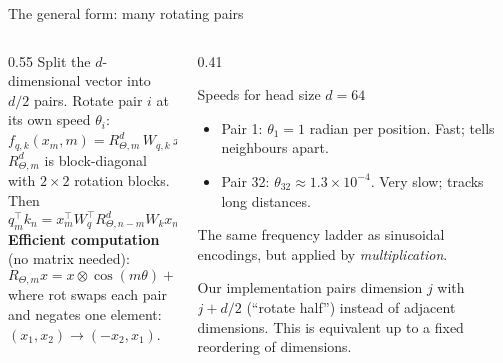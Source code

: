 \documentclass[aspectratio=169,11pt]{beamer}
\begin{document}
\begin{frame}{The general form: many rotating pairs}
  \begin{columns}[T]
    \begin{column}{0.55\textwidth}
      \small
      Split the $d$-dimensional vector into $d/2$ pairs. Rotate pair $i$ at its own speed $\theta_i$:
      \[
        f_{q,k}(x_m,m)=R^d_{\Theta,m}\,W_{q,k}\,x_m,\qquad \theta_i=10000^{-2(i-1)/d}
      \]
      $R^d_{\Theta,m}$ is block-diagonal with $2\times2$ rotation blocks. Then
      \[
        q_m^\top k_n=x_m^\top W_q^\top R^d_{\Theta,n-m}W_kx_n
      \]
      \textbf{Efficient computation} (no matrix needed):
      \[
        R_{\Theta,m}x = x\otimes\cos(m\theta) + \text{rot}(x)\otimes\sin(m\theta)
      \]
      where rot swaps each pair and negates one element: $(x_1,x_2)\to(-x_2,x_1)$.
    \end{column}
    \begin{column}{0.41\textwidth}
      \begin{exampleblock}{Speeds for head size $d=64$}
        \small
        \begin{itemize}
          \item Pair 1: $\theta_1=1$ radian per position. Fast; tells neighbours apart.
          \item Pair 32: $\theta_{32}\approx1.3\times10^{-4}$. Very slow; tracks long distances.
        \end{itemize}
        The same frequency ladder as sinusoidal encodings, but applied by \emph{multiplication}.
      \end{exampleblock}
      \begin{block}{Our implementation}
        \small
         pairs dimension $j$ with $j+d/2$ (``rotate half'') instead of adjacent dimensions. This is equivalent up to a fixed reordering of dimensions.
      \end{block}
    \end{column}
  \end{columns}
\end{frame}
\end{document}
